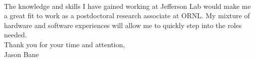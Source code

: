 \documentclass[12pt,letterpaper]{article}
\begin{document}
\paragraph{}The knowledge and skills I have gained working at Jefferson Lab would make me a great fit to work as a postdoctoral research associate at ORNL. My mixture of hardware and software experiences will allow me to quickly step into the roles needed.      
\\

\noindent Thank you for your time and attention,\\
\noindent Jason Bane
\end{document}

